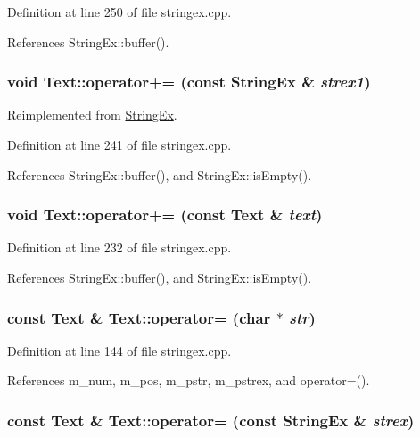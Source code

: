 Definition at line 250 of file stringex.cpp.

References StringEx::buffer().\hypertarget{classText_326e20a30f0362bd9c84cb61a065e9d0}{
\subsubsection[{operator+=}]{\setlength{\rightskip}{0pt plus 5cm}void Text::operator+= (const {\bf StringEx} \& {\em strex1})}}
\label{classText_326e20a30f0362bd9c84cb61a065e9d0}




Reimplemented from \hyperlink{classStringEx_08601f0088a4c472e9485243e03fca16}{StringEx}.

Definition at line 241 of file stringex.cpp.

References StringEx::buffer(), and StringEx::isEmpty().\hypertarget{classText_f6eb72fb91d55570fb8371e7a0479c5e}{
\subsubsection[{operator+=}]{\setlength{\rightskip}{0pt plus 5cm}void Text::operator+= (const {\bf Text} \& {\em text})}}
\label{classText_f6eb72fb91d55570fb8371e7a0479c5e}




Definition at line 232 of file stringex.cpp.

References StringEx::buffer(), and StringEx::isEmpty().\hypertarget{classText_2e533762e9382fe330781206f7fc3c2d}{
\subsubsection[{operator=}]{\setlength{\rightskip}{0pt plus 5cm}const {\bf Text} \& Text::operator= (char $\ast$ {\em str})}}
\label{classText_2e533762e9382fe330781206f7fc3c2d}




Definition at line 144 of file stringex.cpp.

References m\_\-num, m\_\-pos, m\_\-pstr, m\_\-pstrex, and operator=().\hypertarget{classText_c5bed8a0fa6cc15e69fd3f3a6072e6ae}{
\subsubsection[{operator=}]{\setlength{\rightskip}{0pt plus 5cm}const {\bf Text} \& Text::operator= (const {\bf StringEx} \& {\em strex})}}
\label{classText_c5bed8a0fa6cc15e69fd3f3a6072e6ae}




